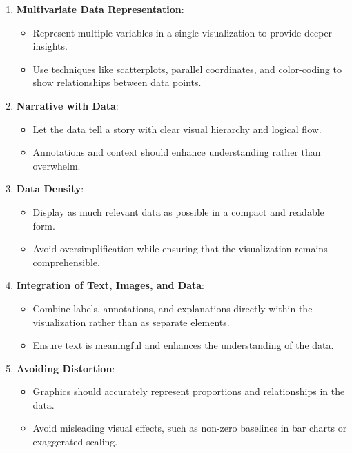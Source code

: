 \documentclass[11pt,a4paper,titlepage]{article}
\begin{document}
\begin{enumerate}
\begin{enumerate}
\begin{enumerate}
\begin{enumerate}
    \item \textbf{Multivariate Data Representation}:
    \begin{itemize}
        \item Represent multiple variables in a single visualization to provide deeper insights.
        \item Use techniques like scatterplots, parallel coordinates, and color-coding to show relationships between data points.
    \end{itemize}
    
    \item \textbf{Narrative with Data}:
    \begin{itemize}
        \item Let the data tell a story with clear visual hierarchy and logical flow.
        \item Annotations and context should enhance understanding rather than overwhelm.
    \end{itemize}
    
    \item \textbf{Data Density}:
    \begin{itemize}
        \item Display as much relevant data as possible in a compact and readable form.
        \item Avoid oversimplification while ensuring that the visualization remains comprehensible.
    \end{itemize}

    \item \textbf{Integration of Text, Images, and Data}:
    \begin{itemize}
        \item Combine labels, annotations, and explanations directly within the visualization rather than as separate elements.
        \item Ensure text is meaningful and enhances the understanding of the data.
    \end{itemize}
    
    \item \textbf{Avoiding Distortion}:
    \begin{itemize}
        \item Graphics should accurately represent proportions and relationships in the data.
        \item Avoid misleading visual effects, such as non-zero baselines in bar charts or exaggerated scaling.
    \end{itemize}


\end{enumerate}
\end{enumerate}
\end{enumerate}
\end{enumerate}
\end{document}
